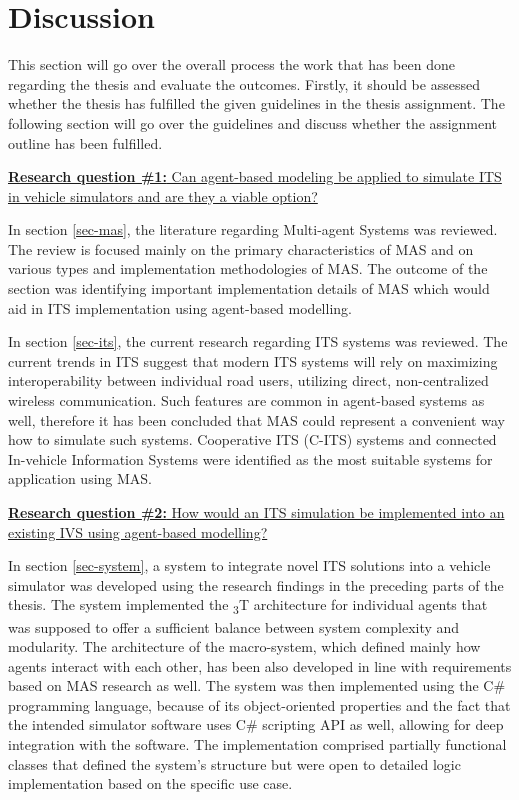 \documentclass[0main.tex]{subfiles}
\begin{document}
\section{Discussion}

This section will go over the overall process the work that has been done regarding the thesis and evaluate the outcomes.
Firstly, it should be assessed whether the thesis has fulfilled the given guidelines in the thesis assignment. The following 
section will go over the guidelines and discuss whether the assignment outline has been fulfilled. 

\ul{\textbf{Research question \#1:} Can agent-based modeling be applied to simulate ITS in vehicle simulators and are they a viable option?}

In section \ref{sec-mas}, the literature regarding Multi-agent Systems was reviewed. The review is focused mainly on the 
primary characteristics of MAS and on various types and implementation methodologies of MAS. The outcome of the section 
was identifying important implementation details of MAS which would aid in ITS implementation using agent-based modelling. 

In section \ref{sec-its}, the current research regarding ITS systems was reviewed. The current trends in ITS suggest that 
modern ITS systems will rely on maximizing interoperability between individual road users, utilizing direct, non-centralized wireless 
communication. Such features are common in agent-based systems as well, therefore it has been concluded that MAS could represent 
a convenient way how to simulate such systems. Cooperative ITS (C-ITS) systems and connected In-vehicle Information Systems were 
identified as the most suitable systems for application using MAS.

\ul{\textbf{Research question \#2:} How would an ITS simulation be implemented into an existing IVS using agent-based modelling?}

In section \ref{sec-system}, a system to integrate novel ITS solutions into a vehicle simulator was developed using the research findings in the 
preceding parts of the thesis. The system implemented the \textsubscript{3}T architecture for individual agents that was supposed 
to offer a sufficient balance between system complexity and modularity. The architecture of the macro-system, which defined mainly 
how agents interact with each other, has been also developed in line with requirements based on MAS research as well. The 
system was then implemented using the C\# programming language, because of its object-oriented properties and the fact that 
the intended simulator software uses C\# scripting API as well, allowing for deep integration with the software. The implementation comprised partially functional classes that 
defined the system's structure but were open to detailed logic implementation based on the specific use case. 
\end{document}
